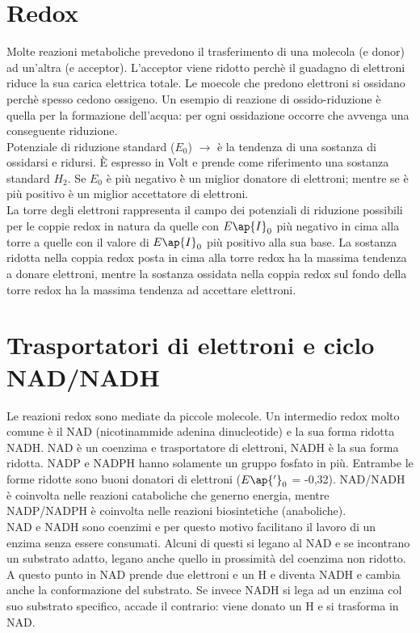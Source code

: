 \section{Redox}
Molte reazioni metaboliche prevedono il trasferimento di una molecola (e\ap{-} donor) ad un'altra (e\ap{-} acceptor). L'acceptor viene ridotto perch\`e il guadagno di elettroni riduce la sua carica elettrica totale. Le moecole che predono elettroni si ossidano perch\`e spesso cedono ossigeno. Un esempio di reazione di ossido-riduzione \`e quella per la formazione dell'acqua: per ogni ossidazione occorre che avvenga una conseguente riduzione.
\\Potenziale di riduzione standard ($E_0$) $\xrightarrow{}$ \`e la tendenza di una sostanza di ossidarsi e ridursi. \`E espresso in Volt e prende come riferimento una sostanza standard $H_2$. Se $E_0$ \`e pi\`u negativo \`è un miglior donatore di elettroni; mentre se \`e pi\`u positivo \`e un miglior accettatore di elettroni.
\\La torre degli elettroni rappresenta il campo dei potenziali di riduzione possibili per le coppie redox in natura da quelle con $E\ap{I}_0$ pi\`u negativo in cima alla torre  a quelle con il valore di $E\ap{I}_0$ pi\`u positivo alla sua base. La sostanza ridotta nella coppia redox posta in cima alla torre redox ha la massima tendenza a donare elettroni, mentre la sostanza ossidata nella coppia redox sul fondo della torre redox ha la massima tendenza ad accettare elettroni. 
\section{Trasportatori di elettroni e ciclo NAD/NADH}
Le reazioni redox sono mediate da piccole molecole. Un intermedio redox molto comune \`e il NAD\ap{+} (nicotinammide adenina dinucleotide) e la sua forma ridotta NADH. NAD\ap{+} \`e un coenzima e trasportatore di elettroni, NADH \`e la sua forma ridotta. NADP\ap{+} e NADPH hanno solamente un gruppo fosfato in pi\`u. Entrambe le forme ridotte sono buoni donatori di elettroni ($E\ap{'}_0$ = -0,32). NAD\ap{+}/NADH \`e coinvolta nelle reazioni cataboliche che generno energia, mentre NADP\ap{+}/NADPH \`e coinvolta nelle reazioni biosintetiche (anaboliche).
\\NAD\ap{+} e NADH sono coenzimi e per questo motivo facilitano il lavoro di un enzima senza essere consumati. Alcuni di questi si legano al NAD\ap{+} e se incontrano un substrato adatto, legano anche quello in prossimit\`a del coenzima non ridotto. A questo punto in NAD prende due elettroni e un H\ap{+} e diventa NADH e cambia anche la conformazione del substrato. Se invece NADH si lega ad un enzima col suo substrato specifico, accade il contrario: viene donato un H\ap{+} e si trasforma in NAD\ap{+}.
